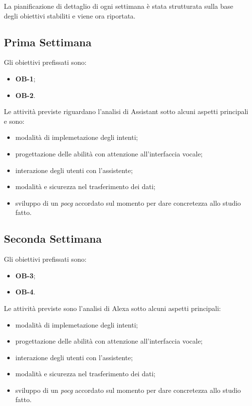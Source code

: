 La pianificazione di dettaglio di ogni settimana è stata strutturata sulla base degli obiettivi stabiliti e viene ora riportata.
	\subsection*{Prima Settimana}
	Gli obiettivi prefissati sono:
	\begin{itemize}
		\item \textbf{OB-1};
		\item \textbf{OB-2}.
	\end{itemize}
	Le attività previste riguardano l'analisi di Assistant sotto alcuni aspetti principali e sono:
	\begin{itemize}
		\item modalità di implemetazione degli intenti;
		\item progettazione delle abilità con attenzione all'interfaccia vocale;
		\item interazione degli utenti con l'assistente;
		\item modalità e sicurezza nel trasferimento dei dati;
		\item sviluppo di un \emph{\gls{pocg}} accordato sul momento per dare concretezza allo studio fatto.
	\end{itemize}
	\subsection*{Seconda Settimana}
	Gli obiettivi prefissati sono:
	\begin{itemize}
		\item \textbf{OB-3};
		\item \textbf{OB-4}.
	\end{itemize}
	Le attività previste sono l'analisi di Alexa sotto alcuni aspetti principali:
	\begin{itemize}
		\item modalità di implemetazione degli intenti;
		\item progettazione delle abilità con attenzione all'interfaccia vocale;
		\item interazione degli utenti con l'assistente;
		\item modalità e sicurezza nel trasferimento dei dati;
		\item sviluppo di un \emph{\gls{pocg}} accordato sul momento per dare concretezza allo studio fatto.
	\end{itemize}
